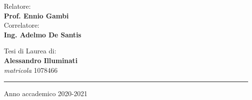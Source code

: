 \begin{titlepage}
    \noindent
    \begin{minipage}[t]{.49\textwidth}
        \flushleft

        {
            \large{ Relatore:\\
                \vspace{1mm}
                \bf{Prof. Ennio Gambi
                }
            }\\

            \vspace{4.3mm}
            {\large{Correlatore:\\
                    \vspace{1mm}
                    \bf{Ing. Adelmo De Santis}
                }
            }
        }\\


    \end{minipage}
    \hspace{1mm}
    \noindent
    \begin{minipage}[t]{.49\textwidth}
        \vspace{6.5mm}
        \flushright
        {\large{ Tesi di Laurea di:\\
                \vspace{1mm}
                \bf{Alessandro Illuminati}
            }\\
        }
        \vspace{2mm}
        \small{\textit{matricola} 1078466}
    \end{minipage}


    \vfill
    \begin{center}
        \rule[0.1cm]{17cm}{0.1mm}
        {
            \large{
                Anno accademico 2020-2021
            }
        }
    \end{center}
\end{titlepage}
\restoregeometry
